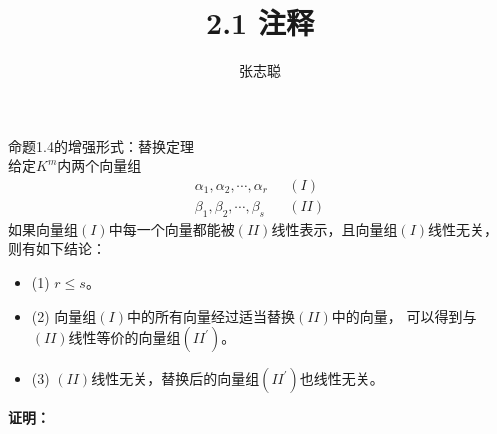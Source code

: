\documentclass{article}
\begin{document}
\title{2.1 注释}
\author{张志聪}
\maketitle

\begin{zremark}
  命题1.4的增强形式：替换定理 \\
  给定$K^m$内两个向量组
  \begin{align*}
    \alpha_1, \alpha_2, \cdots, \alpha_r & \ \ \ (I)  \\
    \beta_1, \beta_2, \cdots, \beta_s    & \ \ \ (II)
  \end{align*}
  如果向量组$(I)$中每一个向量都能被$(II)$线性表示，且向量组$(I)$线性无关，
  则有如下结论：
  \begin{itemize}
    \item (1) $r \leq s$。
    \item (2) 向量组$(I)$中的所有向量经过适当替换$(II)$中的向量，
          可以得到与$(II)$线性等价的向量组$(II^\prime)$。
    \item (3) $(II)$线性无关，替换后的向量组$(II^\prime)$也线性无关。
  \end{itemize}
\end{zremark}

\textbf{证明：}
\end{document}
